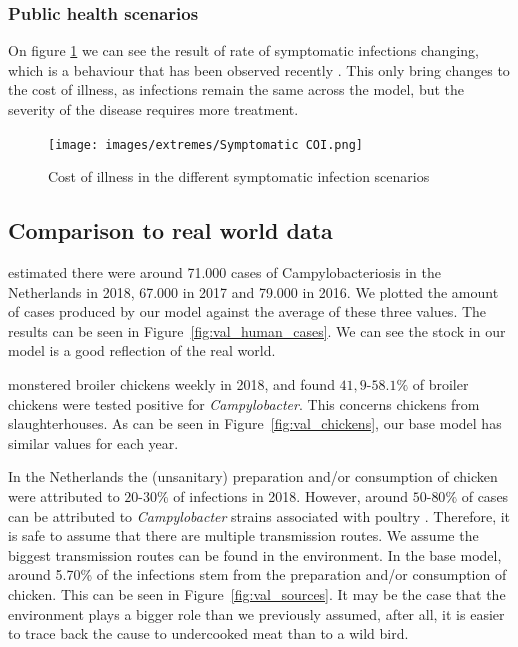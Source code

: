 \subsubsection{Public health scenarios}

On figure \ref{fig:symptom_COI} we can see the result of rate of symptomatic infections changing, which is a behaviour that has been observed recently \parencite{medema_assessment_1996}. This only bring changes to the cost of illness, as infections remain the same across the model, but the severity of the disease requires more treatment.

\begin{figure}[h!]
    \centering
    \texttt{[image: images/extremes/Symptomatic COI.png]} 
    \caption{Cost of illness in the different symptomatic infection scenarios}
    \label{fig:symptom_COI}
\end{figure}

\subsection{Comparison to real world data}

\textcite{vlaanderen_staat_2019} estimated there were around 71.000 cases of Campylobacteriosis in the Netherlands in 2018, 67.000 in 2017 and 79.000 in 2016. We plotted the amount of cases produced by our model against the average of these three values. The results can be seen in Figure~\ref{fig:val_human_cases}. We can see the stock in our model is a good reflection of the real world. 

\textcite{nepluvi_rapportage_2019} monstered broiler chickens weekly in 2018, and found $41,9$-$58.1\%$ of broiler chickens were tested positive for \textit{Campylobacter}. This concerns chickens from slaughterhouses. As can be seen in Figure~\ref{fig:val_chickens}, our base model has similar values for each year.

In the Netherlands the (unsanitary) preparation and/or consumption of chicken were attributed to $20$-$30\%$ of infections in 2018. However, around $50$-$80\%$ of cases can be attributed to \textit{Campylobacter} strains associated with poultry \parencite{cuperus_surveillance_2020, nepluvi_rapportage_2019}. Therefore, it is safe to assume that there are multiple transmission routes. We assume the biggest transmission routes can be found in the environment. In the base model, around 5.70\% of the infections stem from the preparation and/or consumption of chicken. This can be seen in Figure~\ref{fig:val_sources}. It may be the case that the environment plays a bigger role than we previously assumed, after all, it is easier to trace back the cause to undercooked meat than to a wild bird.


